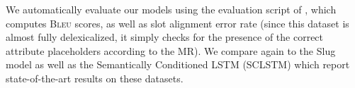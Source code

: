 We automatically evaluate our models using the evaluation script of
\citep{wen2016}, which computes \textsc{Bleu} scores, as well as slot
alignment error rate (since this dataset is almost fully delexicalized,
it simply checks for the presence of the correct attribute placeholders
according to the MR). We compare again to the Slug model as well
as the Semantically Conditioned LSTM (SCLSTM) \citep{wen2015}
which report state-of-the-art results on these datasets.




